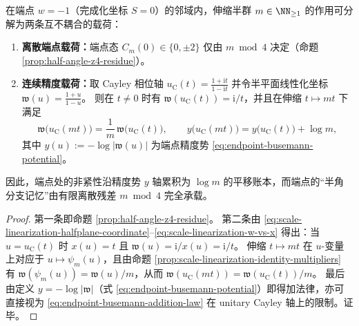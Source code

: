 \begin{proposition}\label{prop:endpoint-orthogonal-decomposition-z4-Rplus}
在端点 \(w=-1\)（完成化坐标 \(S=0\)）的邻域内，伸缩半群 \(m\in\NN_{\ge 1}\) 的作用可分解为两条互不耦合的载荷：
\begin{enumerate}
  \item \textbf{离散端点载荷：}端点态 \(C_m(0)\in\{0,\pm 2\}\) 仅由 \(m\bmod 4\) 决定（命题 \ref{prop:half-angle-z4-residue}）。
  \item \textbf{连续精度载荷：}取 Cayley 相位轴 \(u_{\mathrm C}(t)=\frac{1+\mathrm{i}t}{1-\mathrm{i}t}\) 并令半平面线性化坐标 \(\mathfrak{w}(u)=\frac{1+u}{1-u}\)。
  则在 \(t\neq 0\) 时有 \(\mathfrak{w}(u_{\mathrm C}(t))=\mathrm{i}/t\)，并且在伸缩 \(t\mapsto mt\) 下满足
  \[
  \mathfrak{w}\!\bigl(u_{\mathrm C}(mt)\bigr)=\frac{1}{m}\,\mathfrak{w}\!\bigl(u_{\mathrm C}(t)\bigr),
  \qquad
  y\!\bigl(u_{\mathrm C}(mt)\bigr)=y\!\bigl(u_{\mathrm C}(t)\bigr)+\log m,
  \]
  其中 \(y(u):=-\log|\mathfrak{w}(u)|\) 为端点精度势 \eqref{eq:endpoint-busemann-potential}。
\end{enumerate}
因此，端点处的非紧性沿精度势 \(y\) 轴累积为 \(\log m\) 的平移账本，而端点的“半角分支记忆”由有限离散残差 \(m\bmod 4\) 完全承载。
\end{proposition}
\begin{proof}
第一条即命题 \ref{prop:half-angle-z4-residue}。
第二条由 \eqref{eq:scale-linearization-halfplane-coordinate}--\eqref{eq:scale-linearization-w-vs-x} 得出：当 \(u=u_{\mathrm C}(t)\) 时 \(x(u)=t\) 且 \(\mathfrak{w}(u)=\mathrm{i}/x(u)=\mathrm{i}/t\)。
伸缩 \(t\mapsto mt\) 在 \(u\)-变量上对应于 \(u\mapsto\psi_m(u)\)，且由命题 \ref{prop:scale-linearization-identity-multipliers} 有 \(\mathfrak{w}(\psi_m(u))=\mathfrak{w}(u)/m\)，从而 \(\mathfrak{w}(u_{\mathrm C}(mt))=\mathfrak{w}(u_{\mathrm C}(t))/m\)。
最后由定义 \(y=-\log|\mathfrak{w}|\)（式 \eqref{eq:endpoint-busemann-potential}）即得加法律，亦可直接视为 \eqref{eq:endpoint-busemann-addition-law} 在 unitary Cayley 轴上的限制。证毕。
\end{proof}

